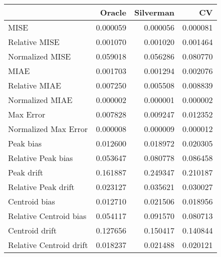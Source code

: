 \begin{tabular}{lrrr}
  \hline
 & Oracle & Silverman & CV \\ 
  \hline
MISE & 0.000059 & 0.000056 & 0.000081 \\ 
  Relative MISE & 0.001070 & 0.001020 & 0.001464 \\ 
  Normalized MISE & 0.059018 & 0.056286 & 0.080770 \\ 
  MIAE & 0.001703 & 0.001294 & 0.002076 \\ 
  Relative MIAE & 0.007250 & 0.005508 & 0.008839 \\ 
  Normalized MIAE & 0.000002 & 0.000001 & 0.000002 \\ 
  Max Error & 0.007828 & 0.009247 & 0.012352 \\ 
  Normalized Max Error & 0.000008 & 0.000009 & 0.000012 \\ 
  Peak bias & 0.012600 & 0.018972 & 0.020305 \\ 
  Relative Peak bias & 0.053647 & 0.080778 & 0.086458 \\ 
  Peak drift & 0.161887 & 0.249347 & 0.210187 \\ 
  Relative Peak drift & 0.023127 & 0.035621 & 0.030027 \\ 
  Centroid bias & 0.012710 & 0.021506 & 0.018956 \\ 
  Relative Centroid bias & 0.054117 & 0.091570 & 0.080713 \\ 
  Centroid drift & 0.127656 & 0.150417 & 0.140844 \\ 
  Relative Centroid drift & 0.018237 & 0.021488 & 0.020121 \\ 
   \hline
\end{tabular}

